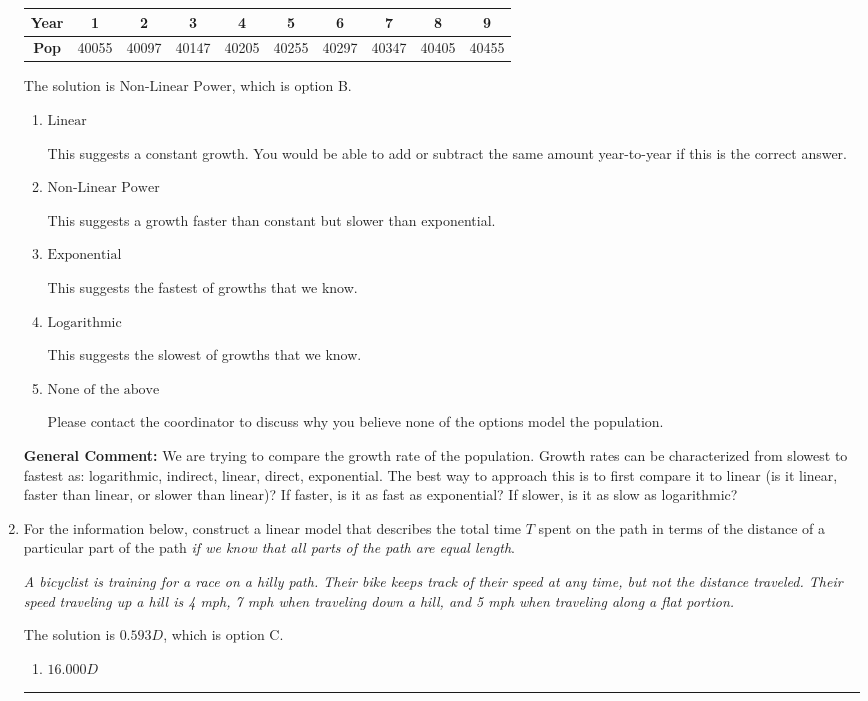 \documentclass{extbook}[14pt]
\newcommand{\litem}[1]{\item #1

\rule{\textwidth}{0.4pt}}
\begin{document}
\begin{enumerate}
{\begin{tabular}{c|c|c|c|c|c|c|c|c|c}
\textbf{Year} &1 &2 &3 &4 &5 &6 &7 &8 &9\tabularnewline \hline
\textbf{Pop} &40055 &40097 &40147 &40205 &40255 &40297 &40347 &40405 &40455\end{tabular}The solution is \( \text{Non-Linear Power} \), which is option B.\begin{enumerate}[label=\Alph*.]
\item \( \text{Linear} \)

This suggests a constant growth. You would be able to add or subtract the same amount year-to-year if this is the correct answer.
\item \( \text{Non-Linear Power} \)

This suggests a growth faster than constant but slower than exponential.
\item \( \text{Exponential} \)

This suggests the fastest of growths that we know.
\item \( \text{Logarithmic} \)

This suggests the slowest of growths that we know.
\item \( \text{None of the above} \)

Please contact the coordinator to discuss why you believe none of the options model the population.
\end{enumerate}

\textbf{General Comment:} We are trying to compare the growth rate of the population. Growth rates can be characterized from slowest to fastest as: logarithmic, indirect, linear, direct, exponential. The best way to approach this is to first compare it to linear (is it linear, faster than linear, or slower than linear)? If faster, is it as fast as exponential? If slower, is it as slow as logarithmic?
}
\litem{
For the information below, construct a linear model that describes the total time $T$ spent on the path in terms of the distance of a particular part of the path \textit{if we know that all parts of the path are equal length}.

\begin{center}
    \textit{ A bicyclist is training for a race on a hilly path. Their bike keeps track of their speed at any time, but not the distance traveled. Their speed traveling up a hill is 4 mph, 7 mph when traveling down a hill, and 5 mph when traveling along a flat portion. }
\end{center}
The solution is \( 0.593 D \), which is option C.\begin{enumerate}[label=\Alph*.]
\item \( 16.000 D \)


\end{enumerate}}
\end{enumerate}
\end{document}
